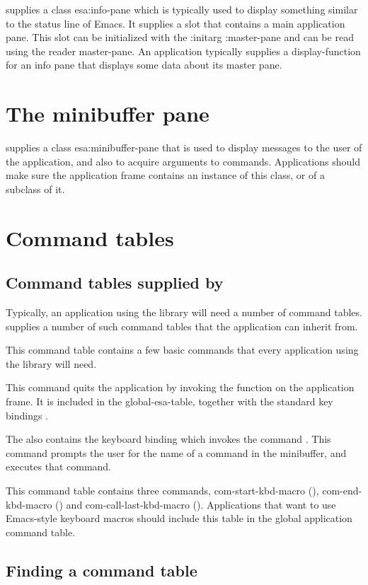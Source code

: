 \sysname{} supplies a class esa:info-pane which is typically used to display
something similar to the status line of Emacs.  It supplies a slot
that contains a main application pane.  This slot can be initialized
with the :initarg :master-pane and can be read using the reader
master-pane.  An application typically supplies a \clim{}
display-function for an info pane that displays some data about its 
master pane. 

\section{The minibuffer pane}

\sysname{} supplies a class esa:minibuffer-pane that is used to display
messages to the user of the application, and also to acquire arguments
to commands.  Applications should make sure the application frame
contains an instance of this class, or of a subclass of it.  

\section{Command tables}

\subsection{Command tables supplied by \sysname{}}

Typically, an application using the \sysname{} library will need a number of
\clim{} command tables.  \sysname{} supplies a number of such command tables
that the application can inherit from.  


This command table contains a few basic commands that every
application using the \sysname{} library will need.

 {}

This command quits the application by invoking the \clim{} function
 on the application frame.  It is included in the
global-esa-table, together with the standard key bindings .

The  also contains the keyboard binding
 which invokes the command .  This
command prompts the user for the name of a command in the minibuffer,
and executes that command.


This command table contains three commands, com-start-kbd-macro
(), com-end-kbd-macro () and
com-call-last-kbd-macro ().  Applications that want to use
Emacs-style keyboard macros should include this table in the global
application command table.

\subsection{Finding a command table}
